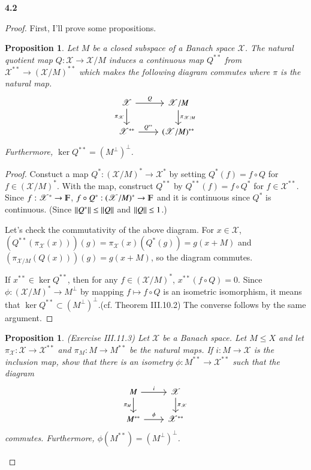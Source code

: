 \documentclass[a4paper, 12pt]{article}
\theoremstyle{Mydefinition}
\theoremstyle{Mytheorem}
\newtheorem{proposition}[statement]{Proposition}
\begin{document}
\noindent \textbf{4.2}
\begin{proof}
First, I'll prove some propositions.
\begin{proposition}
Let $M$ be a closed subspace of a Banach space $\mathscr{X}$. The natural quotient map $Q:\mathscr{X}\rightarrow \mathscr{X}/M$ induces a continuous map $Q^{**}$ from $\mathscr{X}^{**}\rightarrow (\mathscr{X}/M)^{**}$ which makes the following diagram commutes where $\pi$ is the natural map.
\[ \begin{tikzcd}\mathscr{X} \arrow{r}{Q} \arrow[swap]{d}{\pi_{\mathscr{X}}} & \mathscr{X}/M \arrow{d}{\pi_{\mathscr{X}/M}} \\%
\mathscr{X}^{**} \arrow{r}{Q^{**}}& (\mathscr{X}/M)^{**}
\end{tikzcd}
\]
Furthermore, $\ker Q^{**} = (M^\perp)^\perp$.
\end{proposition}
\begin{proof}
Constuct a map $Q^*:(\mathscr{X}/M)^*\rightarrow \mathscr{X}^*$ by setting $Q^*(f) = f\circ Q$ for $f\in (\mathscr{X}/M)^*$. With the map, construct $Q^{**}$ by $Q^{**}(f) = f\circ Q^*$ for $f\in \mathscr{X}^{**}$. Since $f:\mathscr{X}^{*}\rightarrow\varmathbb{F}$, $f\circ Q^*:(\mathscr{X}/M)^*\rightarrow \varmathbb{F}$ and it is continuous since $Q^*$ is continuous. (Since $\norm{Q^*}\leq \norm{Q}$ and $\norm{Q}\leq 1$.)

Let's check the commutativity of the above diagram. For $x\in \mathscr{X}$, $(Q^{**}(\pi_{\mathscr{X}}(x)))(g) = \pi_{\mathscr{X}}(x) (Q^*(g)) = g(x+M)$ and $(\pi_{\mathscr{X}/M}(Q(x)))(g) = g(x+M)$, so the diagram commutes.

If $x^{**}\in \ker Q^{**}$, then for any $f\in (\mathscr{X}/M)^*$, $x^{**}(f\circ Q) = 0$. Since $\phi:(\mathscr{X}/M)^*\rightarrow M^\perp$ by mapping $f\mapsto f\circ Q$ is an isometric isomorphism, it means that $\ker Q^{**}\subset (M^\perp)^\perp$.(cf. Theorem III.10.2) The converse follows by the same argument.
\end{proof}

\begin{proposition}
(Exercise III.11.3) Let $\mathscr{X}$ be a Banach space. Let $M\leq X$ and let $\pi_\mathscr{X}:\mathscr{X}\rightarrow \mathscr{X}^{**}$ and $\pi_M:M\rightarrow M^{**}$ be the natural maps. If $i:M\rightarrow\mathscr{X}$ is the inclusion map, show that there is an isometry $\phi:M^{**}\rightarrow\mathscr{X}^{**}$ such that the diagram
\[ \begin{tikzcd} M \arrow{r}{i} \arrow[swap]{d}{\pi_M} & \mathscr{X} \arrow{d}{\pi_\mathscr{X}} \\%
M^{**} \arrow{r}{\phi}& \mathscr{X}^{**}
\end{tikzcd}
\]
commutes. Furthermore, $\phi(M^{**})=(M^\perp)^\perp$.
\end{proposition}


\end{proof}
\end{document}
